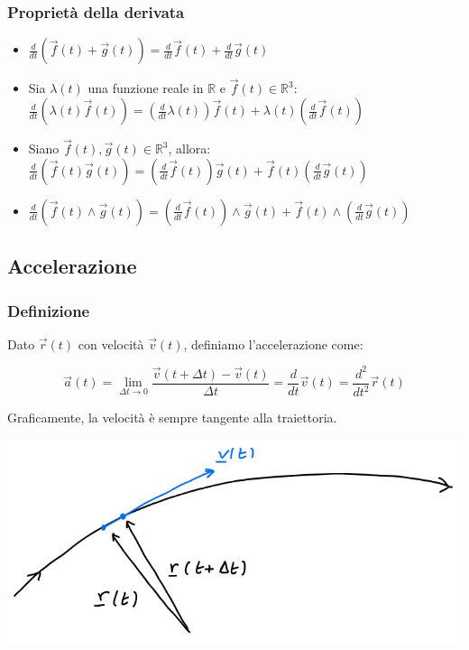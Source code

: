 \documentclass{article}
\begin{document}
\subsubsection{Proprietà della derivata}

\begin{itemize}
    \item $\frac{d}{dt}(\vec{f}(t) + \vec{g}(t)) = \frac{d}{dt}\vec{f}(t) + \frac{d}{dt}\vec{g}(t)$
    \item Sia $\lambda(t)$ una funzione reale in $\mathbb{R}$ e $\vec{f}(t) \in \mathbb{R}^3$: $\frac{d}{dt}(\lambda(t)\vec{f}(t)) = (\frac{d}{dt}\lambda(t))\vec{f}(t) + \lambda(t)(\frac{d}{dt}\vec{f}(t))$
    \item Siano $\vec{f}(t), \vec{g}(t) \in \mathbb{R}^3$, allora: $\frac{d}{dt}(\vec{f}(t)\vec{g}(t)) = (\frac{d}{dt}\vec{f}(t))\vec{g}(t) + \vec{f}(t)(\frac{d}{dt}\vec{g}(t))$
    \item $\frac{d}{dt}(\vec{f}(t) \wedge \vec{g}(t)) = (\frac{d}{dt}\vec{f}(t)) \wedge \vec{g}(t) + \vec{f}(t) \wedge (\frac{d}{dt}\vec{g}(t))$
\end{itemize}

\subsection{Accelerazione}

\subsubsection{Definizione}

Dato $\vec{r}(t)$ con velocità $\vec{v}(t)$, definiamo l'accelerazione come:

$$
\vec{a}(t) = \lim_{\Delta t \to 0} \frac{\vec{v}(t + \Delta t) - \vec{v}(t)}{\Delta t} = \frac{d}{dt} \vec{v}(t) = \frac{d^2}{dt^2} \vec{r}(t)
$$

\noindent
Graficamente, la velocità è sempre tangente alla traiettoria.

\includegraphics[width=\columnwidth]{rappresentazione-accelerazione-grafica}
\end{document}
